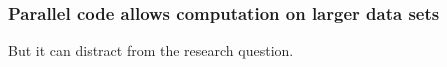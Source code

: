 \documentclass{beamer}
\begin{document}
\begin{frame}

    \frametitle{Parallel code allows computation on larger data sets}

    \pause
    But it can distract from the research question.

%
%

\end{frame}
\end{document}
